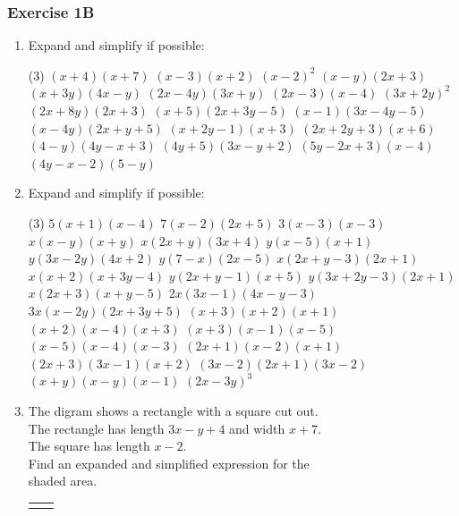 \documentclass[fleqn]{article}
\newcommand{\exercise}{\subsubsection}
\begin{document}
\exercise{Exercise 1B}
\begin{enumerate}
	\item Expand and simplify if possible:
		\begin{tasks}(3) %
			\task $(x+4)(x+7)$			%
			\task $(x-3)(x+2)$			%
			\task $(x-2)^2$				%
			\task $(x-y)(2x+3)$			%
			\task $(x+3y)(4x-y)$			%
			\task $(2x-4y)(3x+y)$		%
			\task $(2x-3)(x-4)$			%
			\task $(3x+2y)^2$			%
			\task $(2x+8y)(2x+3)$		%
			\task $(x+5)(2x+3y-5)$		%
			\task $(x-1)(3x-4y-5)$		%
			\task $(x-4y)(2x+y+5)$		%
			\task $(x+2y-1)(x+3)$		%
			\task $(2x+2y+3)(x+6)$		%
			\task $(4-y)(4y-x+3)$		%
			\task $(4y+5)(3x-y+2)$		%
			\task $(5y-2x+3)(x-4)$		%
			\task $(4y-x-2)(5-y)$		%
		\end{tasks}
	\newpage
	\item Expand and simplify if possible:
		\begin{tasks}(3) %
			\task $5(x+1)(x-4)$			%
			\task $7(x-2)(2x+5)$			%
			\task $3(x-3)(x-3)$			%
			\task $x(x-y)(x+y)$			%
			\task $x(2x+y)(3x+4)$		%
			\task $y(x-5)(x+1)$			%
			\task $y(3x-2y)(4x+2)$		%
			\task $y(7-x)(2x-5)$			%
			\task $x(2x+y-3)(2x+1)$		%
			\task $x(x+2)(x+3y-4)$		%
			\task $y(2x+y-1)(x+5)$		%
			\task $y(3x+2y-3)(2x+1)$		%
			\task $x(2x+3)(x+y-5)$		%
			\task $2x(3x-1)(4x-y-3)$		%
			\task $3x(x-2y)(2x+3y+5)$	%
			\task $(x+3)(x+2)(x+1)$		%
			\task $(x+2)(x-4)(x+3)$		%
			\task $(x+3)(x-1)(x-5)$		%
			\task $(x-5)(x-4)(x-3)$		%
			\task $(2x+1)(x-2)(x+1)$		%
			\task $(2x+3)(3x-1)(x+2)$	%
			\task $(3x-2)(2x+1)(3x-2)$	%
			\task $(x+y)(x-y)(x-1)$		%
			\task $(2x-3y)^3$			%
		\end{tasks}
	\item The digram shows a rectangle with a square cut out.			\\ %
		  \indent The rectangle has length $3x-y+4$ and width $x+7$. 	\\
		  The square has length $x-2$.									\\
		  Find an expanded and simplified expression for the 			\\
		  shaded area.\vspace{-4mm}\\
		\begin{table}[!ht]
			\begin{tabularx}{\dimexpr\textwidth}{X@{\hskip10pt}p{3in}}
				{
					\hspace{8mm}
					\begin{tikzpicture}[x=0.75pt,y=0.75pt,yscale=-0.75,xscale=0.75]
						

\end{tikzpicture}}
\end{tabularx}
\end{table}
\end{enumerate}
\end{document}
